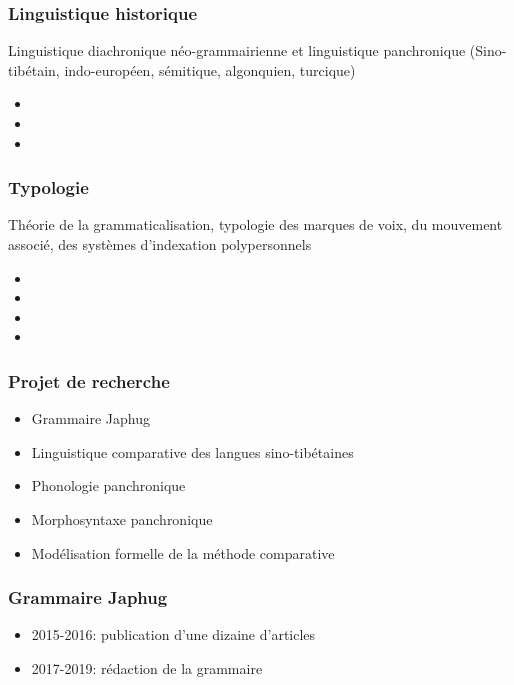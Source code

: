 \documentclass[xcolor=table]{beamer}
\begin{document}
   \begin{frame} 
 \frametitle{Linguistique historique} 
 
 Linguistique diachronique néo-grammairienne et linguistique panchronique (Sino-tibétain, indo-européen, sémitique, algonquien, turcique)
 \begin{itemize}%
\item {}  
\item {}  
\item {}  
\end{itemize}
   \end{frame} 
   
   \begin{frame} 
 \frametitle{Typologie} 
 
 Théorie de la grammaticalisation, typologie des marques de voix, du mouvement associé, des systèmes d'indexation polypersonnels
 \begin{itemize}%
\item {}  
\item {}  
\item {}  
\item {}  
\end{itemize}
   \end{frame} 
    
  \begin{frame} 
 \frametitle{Projet de recherche} 
 

\begin{itemize}%
\item Grammaire Japhug
\item Linguistique comparative des langues sino-tibétaines
\item Phonologie panchronique
\item Morphosyntaxe panchronique  
\item Modélisation formelle de la méthode comparative 
\end{itemize}
   
  \end{frame}   

   \begin{frame} 
 \frametitle{Grammaire Japhug} 
 \begin{itemize}%
 \item 2015-2016: publication d'une dizaine d'articles
\item 2017-2019: rédaction de la grammaire
\end{itemize}
   \end{frame} 
   
\end{document}
